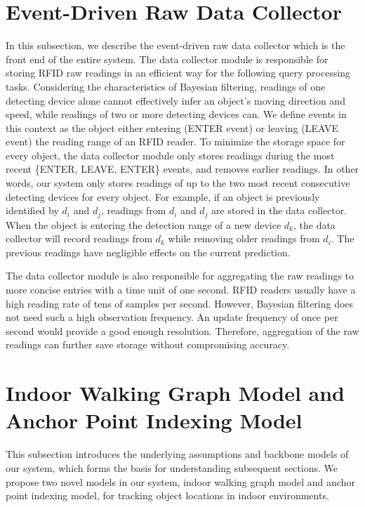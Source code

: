 \documentclass[12pt]{report}
\begin{document}
\chapter{Event-Driven Raw Data Collector}
\label{sec:data-collector}
In this subsection, we describe the event-driven raw data collector
which is the front end of the entire system. The data collector
module is responsible for storing RFID raw readings in an efficient
way for the following query processing tasks.  Considering the
characteristics of Bayesian filtering, readings of one detecting
device alone cannot effectively infer an object's moving direction
and speed, while readings of two or more detecting devices can. We
define events in this context as the object either entering (ENTER
event) or leaving (LEAVE event) the reading range of an RFID
reader. To minimize the storage space for every object, the data
collector module only stores readings during the most recent
\{ENTER, LEAVE, ENTER\} events, and removes earlier readings. In
other words, our system only stores readings of up to the two most
recent consecutive detecting devices for every object. For example,
if an object is previously identified by \(d_i\) and \(d_j\),
readings from \(d_i\) and \(d_j\) are stored in the data
collector. When the object is entering the detection range of a new
device \(d_k\), the data collector will record readings from
\(d_k\) while removing older readings from \(d_i\). The previous
readings have negligible effects on the current prediction.

The data collector module is also responsible for aggregating the
raw readings to more concise entries with a time unit of one
second. RFID readers usually have a high reading rate of tens of
samples per second.  However, Bayesian filtering does not need such
a high observation frequency.  An update frequency of once per
second would provide a good enough resolution.  Therefore,
aggregation of the raw readings can further save storage without
compromising accuracy.

\chapter{Indoor Walking Graph Model and Anchor Point Indexing Model}
\label{sec:walking-graph-anchor-point}
This subsection introduces the underlying assumptions and backbone
models of our system, which forms the basis for understanding
subsequent sections.  We propose two novel models in our system,
indoor walking graph model and anchor point indexing model, for
tracking object locations in indoor environments.
\end{document}
